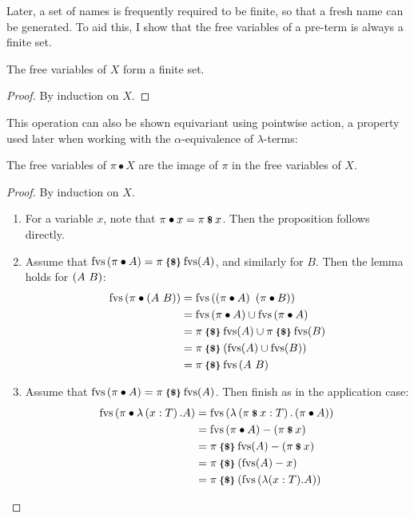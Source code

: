 Later, a set of names is frequently required to be finite, so that a fresh name can be generated.
To aid this, I show that the free variables of a pre-term is always a finite set.

\begin{lemma}
The free variables of \(X\) form a finite set.
\end{lemma}
\begin{proof}
By induction on \(X\).
\end{proof}

This operation can also be shown equivariant using pointwise action, a property used later when working with the \(\alpha\)-equivalence of \(\lambda\)-terms:

\begin{lemma}
The free variables of \(\pi \bullet X\) are the image of \(\pi\) in the free variables of \(X\).
\end{lemma}
\begin{proof}
By induction on \(X\).
\begin{enumerate}
\item
For a variable \(x\), note that \(\pi \bullet x = \pi \dollar x\).
Then the proposition follows directly.
\item
Assume that \(\fvs\wrap{\pi \bullet A} = \pi \image \fvs(A)\), and similarly for \(B\).
Then the lemma holds for \(\wrap{A\ B}\):
\begin{align*}
\fvs\wrap{\pi \bullet \wrap{A\ B}}
&= \fvs\wrap{\wrap{\pi \bullet A}\ \wrap{\pi \bullet B}}\\
&= \fvs\wrap{\pi \bullet A} \cup \fvs\wrap{\pi \bullet A}\\
&= \pi \image \fvs(A) \cup \pi \image \fvs(B)\\
&= \pi \image \wrap{\fvs(A) \cup \fvs(B)}\\
&= \pi \image \fvs\wrap{A\ B}
\end{align*}
\item
Assume that \(\fvs\wrap{\pi \bullet A} = \pi \image \fvs(A)\).
Then finish as in the application case:
\begin{align*}
\fvs\wrap{\pi \bullet \lambda \wrap{x:T}.A} 
&= \fvs\wrap{\lambda \wrap{\pi \dollar x : T}. \wrap{\pi \bullet A}}\\
&= \fvs\wrap{\pi \bullet A} - \wrap{\pi \dollar x}\\
&= \pi \image \fvs(A) - \wrap{\pi \dollar x}\\
&= \pi \image \wrap{\fvs(A) - x}\\
&= \pi \image \wrap{\fvs\wrap{\lambda (x:T).A}}
\end{align*}
\end{enumerate}
\end{proof}

